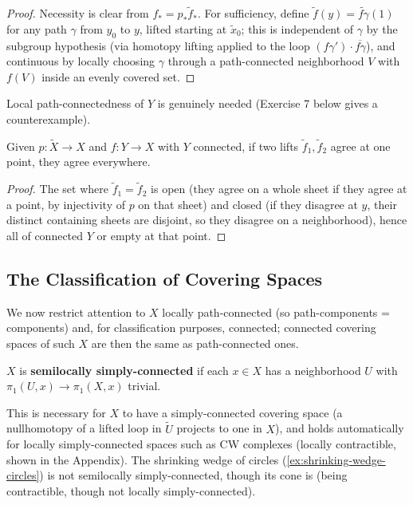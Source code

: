 \begin{proof}
Necessity is clear from $f_*=p_*\tilde f_*$. For sufficiency, define $\tilde f(y)=\widetilde{f\gamma}(1)$
for any path $\gamma$ from $y_0$ to $y$, lifted starting at $\tilde x_0$; this is independent
of $\gamma$ by the subgroup hypothesis (via homotopy lifting applied to the loop
$(f\gamma')\cdot\overline{f\gamma}$), and continuous by locally choosing $\gamma$ through a
path-connected neighborhood $V$ with $f(V)$ inside an evenly covered set.
\end{proof}

Local path-connectedness of $Y$ is genuinely needed (Exercise 7 below gives a
counterexample).

\begin{proposition}
\label{prop:covering-unique-lifting}
Given $p:\tilde X\to X$ and $f:Y\to X$ with $Y$ connected, if two lifts
$\tilde f_1,\tilde f_2$ agree at one point, they agree everywhere.
\end{proposition}

\begin{proof}
The set where $\tilde f_1=\tilde f_2$ is open (they agree on a whole sheet if they agree
at a point, by injectivity of $p$ on that sheet) and closed (if they disagree at $y$,
their distinct containing sheets are disjoint, so they disagree on a neighborhood),
hence all of connected $Y$ or empty at that point.
\end{proof}

\subsection*{The Classification of Covering Spaces}

We now restrict attention to $X$ locally path-connected (so path-components =
components) and, for classification purposes, connected; connected covering spaces
of such $X$ are then the same as path-connected ones.

\begin{definition}
\label{def:semilocally-simply-connected}
$X$ is \textbf{semilocally simply-connected} if each $x\in X$ has a neighborhood $U$
with $\pi_1(U,x)\to\pi_1(X,x)$ trivial.
\end{definition}

This is necessary for $X$ to have a simply-connected covering space (a nullhomotopy
of a lifted loop in $\tilde U$ projects to one in $X$), and holds automatically for
locally simply-connected spaces such as CW complexes (locally contractible, shown
in the Appendix). The shrinking wedge of circles (\cref{ex:shrinking-wedge-circles}) is
not semilocally simply-connected, though its cone is (being contractible, though not
locally simply-connected).

